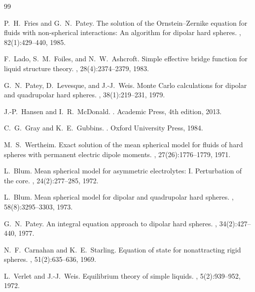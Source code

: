 \documentclass[11pt,a4paper]{article}
\begin{document}

\begin{thebibliography}{99}

P.~H.~Fries and G.~N.~Patey.
\newblock The solution of the {O}rnstein--{Z}ernike equation for fluids with non-spherical interactions: {A}n algorithm for dipolar hard spheres.
, 82(1):429--440, 1985.

F.~Lado, S.~M.~Foiles, and N.~W.~Ashcroft.
\newblock Simple effective bridge function for liquid structure theory.
, 28(4):2374--2379, 1983.

G.~N.~Patey, D.~Levesque, and J.-J.~Weis.
\newblock Monte {C}arlo calculations for dipolar and quadrupolar hard spheres.
, 38(1):219--231, 1979.

J.-P.~Hansen and I.~R.~McDonald.
.
\newblock Academic Press, 4th edition, 2013.

C.~G.~Gray and K.~E.~Gubbins.
.
\newblock Oxford University Press, 1984.

M.~S.~Wertheim.
\newblock Exact solution of the mean spherical model for fluids of hard spheres with permanent electric dipole moments.
, 27(26):1776--1779, 1971.

L.~Blum.
\newblock Mean spherical model for asymmetric electrolytes: {I}. {P}erturbation of the core.
, 24(2):277--285, 1972.

L.~Blum.
\newblock Mean spherical model for dipolar and quadrupolar hard spheres.
, 58(8):3295--3303, 1973.

G.~N.~Patey.
\newblock An integral equation approach to dipolar hard spheres.
, 34(2):427--440, 1977.

N.~F.~Carnahan and K.~E.~Starling.
\newblock Equation of state for nonattracting rigid spheres.
, 51(2):635--636, 1969.

L.~Verlet and J.-J.~Weis.
\newblock Equilibrium theory of simple liquids.
, 5(2):939--952, 1972.

\end{thebibliography}
\end{document}
